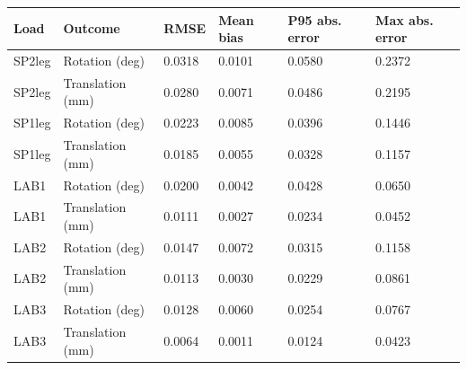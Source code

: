 \begin{tabular}{llllll}
\toprule
Load & Outcome & RMSE & Mean bias & P95 abs. error & Max abs. error \\
\midrule
SP2leg & Rotation (deg) & 0.0318 & 0.0101 & 0.0580 & 0.2372 \\
SP2leg & Translation (mm) & 0.0280 & 0.0071 & 0.0486 & 0.2195 \\
SP1leg & Rotation (deg) & 0.0223 & 0.0085 & 0.0396 & 0.1446 \\
SP1leg & Translation (mm) & 0.0185 & 0.0055 & 0.0328 & 0.1157 \\
LAB1 & Rotation (deg) & 0.0200 & 0.0042 & 0.0428 & 0.0650 \\
LAB1 & Translation (mm) & 0.0111 & 0.0027 & 0.0234 & 0.0452 \\
LAB2 & Rotation (deg) & 0.0147 & 0.0072 & 0.0315 & 0.1158 \\
LAB2 & Translation (mm) & 0.0113 & 0.0030 & 0.0229 & 0.0861 \\
LAB3 & Rotation (deg) & 0.0128 & 0.0060 & 0.0254 & 0.0767 \\
LAB3 & Translation (mm) & 0.0064 & 0.0011 & 0.0124 & 0.0423 \\
\bottomrule
\end{tabular}
